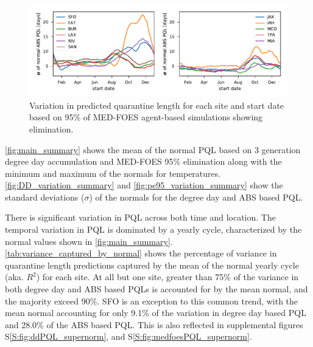 \documentclass[10pt,a4paper,twocolumn]{article}
\begin{document}
\begin{figure}[ht!]
\centering
\includegraphics{figs/fig_pe95_variation.pdf}
\caption{\label{fig:pe95_variation_summary}Variation in predicted quarantine length 
for each site and start date
based on 95\% of MED-FOES agent-based simulations showing elimination.}
\end{figure}


\autoref{fig:main_summary} shows 
the mean of the normal PQL based on 3 generation degree day accumulation 
and MED-FOES 95\% elimination
along with the minimum and maximum of the normals for temperatures.
\autoref{fig:DD_variation_summary} and \autoref{fig:pe95_variation_summary} show the 
standard deviations ($\sigma$) of the normals for the degree day and ABS based PQL.

There is significant variation in PQL across both time and location.
The temporal variation in PQL is dominated by a yearly cycle, 
characterized by the normal values shown in \autoref{fig:main_summary}.
\autoref{tab:variance_captured_by_normal} shows the percentage of variance in 
quarantine length predictions captured by the mean of the normal yearly cycle (aka. $R^2$) for each site.
At all but one site, greater than 75\% of the variance in both degree day and ABS based PQLs
is accounted for by the mean normal, and the majority exceed 90\%.
SFO is an exception to this common trend, with the mean normal accounting for only 9.1\% of the variation in 
degree day based PQL and 28.0\% of the ABS based PQL.
This is also reflected in supplemental figures
S\ref{S:fig:ddPQL_supernorm},
and S\ref{S:fig:medfoesPQL_supernorm}.
\end{document}
